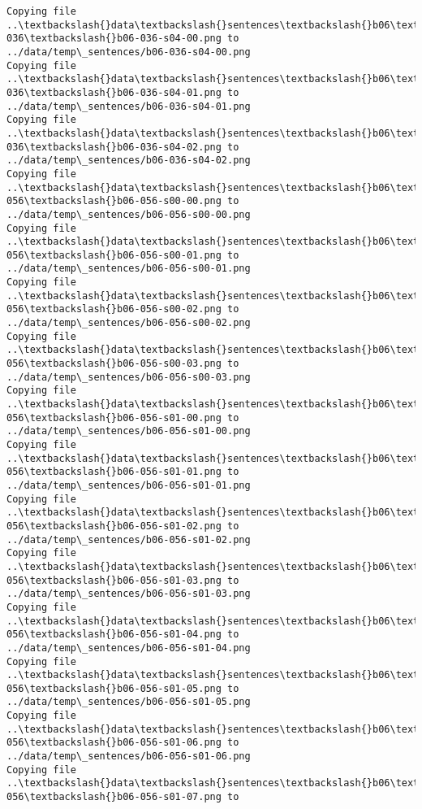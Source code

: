 \documentclass[11pt]{article}
\begin{document}
\begin{Verbatim}[commandchars=\\\{\}]
Copying file ..\textbackslash{}data\textbackslash{}sentences\textbackslash{}b06\textbackslash{}b06-036\textbackslash{}b06-036-s04-00.png to
../data/temp\_sentences/b06-036-s04-00.png
Copying file ..\textbackslash{}data\textbackslash{}sentences\textbackslash{}b06\textbackslash{}b06-036\textbackslash{}b06-036-s04-01.png to
../data/temp\_sentences/b06-036-s04-01.png
Copying file ..\textbackslash{}data\textbackslash{}sentences\textbackslash{}b06\textbackslash{}b06-036\textbackslash{}b06-036-s04-02.png to
../data/temp\_sentences/b06-036-s04-02.png
Copying file ..\textbackslash{}data\textbackslash{}sentences\textbackslash{}b06\textbackslash{}b06-056\textbackslash{}b06-056-s00-00.png to
../data/temp\_sentences/b06-056-s00-00.png
Copying file ..\textbackslash{}data\textbackslash{}sentences\textbackslash{}b06\textbackslash{}b06-056\textbackslash{}b06-056-s00-01.png to
../data/temp\_sentences/b06-056-s00-01.png
Copying file ..\textbackslash{}data\textbackslash{}sentences\textbackslash{}b06\textbackslash{}b06-056\textbackslash{}b06-056-s00-02.png to
../data/temp\_sentences/b06-056-s00-02.png
Copying file ..\textbackslash{}data\textbackslash{}sentences\textbackslash{}b06\textbackslash{}b06-056\textbackslash{}b06-056-s00-03.png to
../data/temp\_sentences/b06-056-s00-03.png
Copying file ..\textbackslash{}data\textbackslash{}sentences\textbackslash{}b06\textbackslash{}b06-056\textbackslash{}b06-056-s01-00.png to
../data/temp\_sentences/b06-056-s01-00.png
Copying file ..\textbackslash{}data\textbackslash{}sentences\textbackslash{}b06\textbackslash{}b06-056\textbackslash{}b06-056-s01-01.png to
../data/temp\_sentences/b06-056-s01-01.png
Copying file ..\textbackslash{}data\textbackslash{}sentences\textbackslash{}b06\textbackslash{}b06-056\textbackslash{}b06-056-s01-02.png to
../data/temp\_sentences/b06-056-s01-02.png
Copying file ..\textbackslash{}data\textbackslash{}sentences\textbackslash{}b06\textbackslash{}b06-056\textbackslash{}b06-056-s01-03.png to
../data/temp\_sentences/b06-056-s01-03.png
Copying file ..\textbackslash{}data\textbackslash{}sentences\textbackslash{}b06\textbackslash{}b06-056\textbackslash{}b06-056-s01-04.png to
../data/temp\_sentences/b06-056-s01-04.png
Copying file ..\textbackslash{}data\textbackslash{}sentences\textbackslash{}b06\textbackslash{}b06-056\textbackslash{}b06-056-s01-05.png to
../data/temp\_sentences/b06-056-s01-05.png
Copying file ..\textbackslash{}data\textbackslash{}sentences\textbackslash{}b06\textbackslash{}b06-056\textbackslash{}b06-056-s01-06.png to
../data/temp\_sentences/b06-056-s01-06.png
Copying file ..\textbackslash{}data\textbackslash{}sentences\textbackslash{}b06\textbackslash{}b06-056\textbackslash{}b06-056-s01-07.png to

\end{Verbatim}
\end{document}
